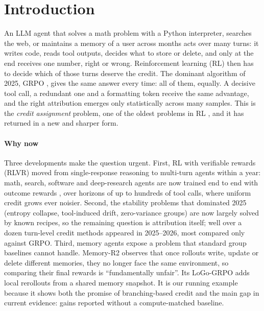 \section{Introduction}\label{sec:intro}

An LLM agent that solves a math problem with a Python interpreter, searches the web, or maintains a memory of a user across months acts over many turns: it writes code, reads tool outputs, decides what to store or delete, and only at the end receives one number, right or wrong. Reinforcement learning (RL) then has to decide which of those turns deserve the credit. The dominant algorithm of 2025, GRPO \citep{shao2024deepseekmath}, gives the same answer every time: all of them, equally. A decisive tool call, a redundant one and a formatting token receive the same advantage, and the right attribution emerges only statistically across many samples. This is the \emph{credit assignment} problem, one of the oldest problems in RL \citep{sutton1988learning,pignatelli2024survey}, and it has returned in a new and sharper form.

\paragraph{Why now}
Three developments make the question urgent. First, RL with verifiable rewards (RLVR) moved from single-response reasoning to multi-turn agents within a year: math, search, software and deep-research agents are now trained end to end with outcome rewards \citep{zhang2025landscape}, over horizons of up to hundreds of tool calls, where uniform credit grows ever noisier. Second, the stability problems that dominated 2025 (entropy collapse, tool-induced drift, zero-variance groups) are now largely solved by known recipes, so the remaining question is attribution itself; well over a dozen turn-level credit methods appeared in 2025--2026, most compared only against GRPO. Third, memory agents expose a problem that standard group baselines cannot handle. Memory-R2 \citep{yan2026memory} observes that once rollouts write, update or delete different memories, they no longer face the same environment, so comparing their final rewards is ``fundamentally unfair''\unverified. Its LoGo-GRPO adds local rerollouts from a shared memory snapshot. It is our running example because it shows both the promise of branching-based credit and the main gap in current evidence: gains reported without a compute-matched baseline.

